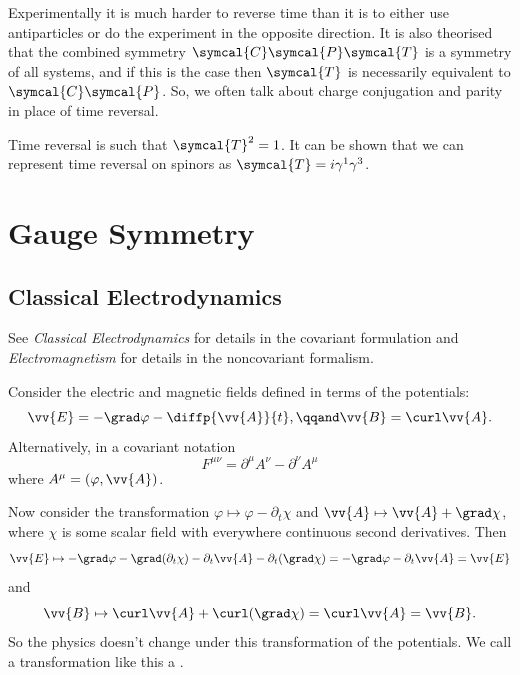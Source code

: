 \documentclass[fleqn]{NotesClass}
\newcommand{\course}[1]{\textit{#1}}
\newcommand{\parity}{\symcal{P}}
\newcommand{\chargeConjugation}{\symcal{C}}
\newcommand{\timeReversal}{\symcal{T}}
\begin{document}
    Experimentally it is much harder to reverse time than it is to either use antiparticles or do the experiment in the opposite direction.
    It is also theorised that the combined symmetry \(\chargeConjugation\parity\timeReversal\) is a symmetry of all systems, and if this is the case then \(\timeReversal\) is necessarily equivalent to \(\chargeConjugation\parity\).
    So, we often talk about charge conjugation and parity in place of time reversal.
    
    Time reversal is such that \(\timeReversal^2 = 1\).
    It can be shown that  we can represent time reversal on spinors as \(\timeReversal = i\gamma^1\gamma^3\).
    
    \section{Gauge Symmetry}
    \subsection{Classical Electrodynamics}
    \begin{rmk}
        See \course{Classical Electrodynamics} for details in the covariant formulation and \course{Electromagnetism} for details in the noncovariant formalism.
    \end{rmk}
    Consider the electric and magnetic fields defined in terms of the potentials:
    \begin{equation}
        \vv{E} = -\grad\varphi - \diffp{\vv{A}}{t}, \qqand \vv{B} = \curl \vv{A}.
    \end{equation}
    Alternatively, in a covariant notation
    \begin{equation}
        F^{\mu\nu} = \partial^\mu A^\nu - \partial^\nu A^\mu
    \end{equation}
    where \(A^\mu = (\varphi, \vv{A})\).
    
    Now consider the transformation \(\varphi \mapsto \varphi - \partial_t\chi\) and \(\vv{A} \mapsto \vv{A} + \grad\chi\), where \(\chi\) is some scalar field with everywhere continuous second derivatives.
    Then
    \begin{equation}
        \vv{E} \mapsto -\grad\varphi - \grad(\partial_t \chi) - \partial_t\vv{A} - \partial_t(\grad \chi) = -\grad\varphi - \partial_t\vv{A} = \vv{E}
    \end{equation}
    and
    \begin{equation}
        \vv{B} \mapsto \curl\vv{A} + \curl(\grad\chi) = \curl\vv{A} = \vv{B}.
    \end{equation}
    So the physics doesn't change under this transformation of the potentials.
    We call a transformation like this a .
    
\end{document}
